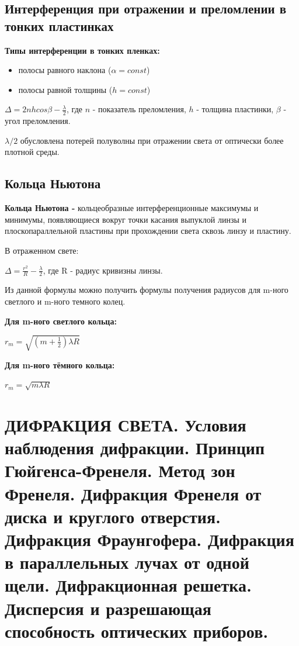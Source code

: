 \documentclass[12pt]{report}
\begin{document}
\subsection{Интерференция при отражении и преломлении в тонких пластинках}
\textbf{Типы интерференции в тонких пленках:}\par
\begin{itemize}
    \item полосы равного наклона ($\alpha = const$)\par
    \item полосы равной толщины ($h = const$)\par
\end{itemize}
$\Delta = 2nh cos \beta - \frac{\lambda}{2}$, где $n$ - показатель преломления, $h$ - толщина пластинки, $\beta$ - угол преломления.\par
$\lambda /2$ обусловлена потерей полуволны при отражении света от оптически более плотной среды.\par

\subsection{Кольца Ньютона}
\textbf{Кольца Ньютона -} кольцеобразные интерференционные максимумы и минимумы, появляющиеся вокруг точки касания выпуклой линзы и плоскопараллельной пластины при прохождении света сквозь линзу и пластину. \par
В отраженном свете:\par
$\Delta = \frac{r^2}{R} - \frac{\lambda}{2}$, где R - радиус кривизны линзы.\par
Из данной формулы можно получить формулы получения радиусов для m-ного светлого и m-ного темного колец.\par
\textbf{Для m-ного светлого кольца:}\par
$r_{m} = \sqrt{(m + \frac{1}{2}) \lambda R}$\par
\textbf{Для m-ного тёмного кольца:}\par
$r_{m} = \sqrt{m \lambda R}$\par


\section{ДИФРАКЦИЯ СВЕТА. Условия наблюдения дифракции. Принцип Гюйгенса-Френеля. Метод зон Френеля. Дифракция Френеля от диска и круглого отверстия. Дифракция Фраунгофера. Дифракция в параллельных лучах от одной щели. Дифракционная решетка. Дисперсия и разрешающая способность оптических приборов.}
\end{document}
